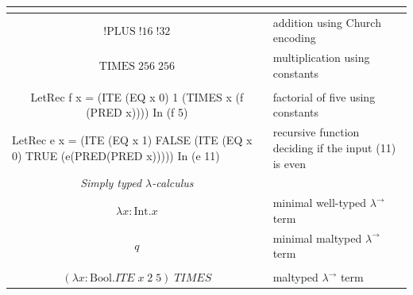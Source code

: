 \documentclass[table, a4paper, 10pt]{article}
\begin{document}
\begin{table}[H]
\begin{tabular}{cl}
\multicolumn{1}{|c|}{}                                                                                              & \multicolumn{1}{l|}{}                                                        \\ \hline
\multicolumn{1}{|c|}{$!\mathrm{PLUS}\;!\mathrm{16}\;!\mathrm{32}$}                                                  & \multicolumn{1}{l|}{addition using Church encoding}                          \\ \hline
\multicolumn{1}{|c|}{$\mathrm{TIMES}\;\mathrm{256}\;\mathrm{256}$}                                                  & \multicolumn{1}{l|}{multiplication using constants}                          \\ \hline
\multicolumn{1}{|c|}{}                                                                                              & \multicolumn{1}{l|}{}                                                        \\ \hline
\multicolumn{1}{|c|}{\scriptsize LetRec f x = (ITE (EQ x 0) 1 (TIMES x (f (PRED x)))) In (f 5)}                     & \multicolumn{1}{l|}{factorial of five using constants}                       \\ \hline
\multicolumn{1}{|l|}{\scriptsize LetRec e x = (ITE (EQ x 1) FALSE (ITE (EQ x 0) TRUE (e(PRED(PRED x))))) In (e 11)} & \multicolumn{1}{l|}{recursive function deciding if the input (11) is even}   \\ \hline
\multicolumn{1}{|c|}{\scriptsize \textit{Simply typed $\lambda$-calculus}}                                          & \multicolumn{1}{l|}{}                                                        \\ \hline
\multicolumn{1}{|c|}{$\lambda x:\mathrm{Int}.x$}                                                                    & \multicolumn{1}{l|}{minimal well-typed $\lambda^\to$ term}                   \\ \hline
\multicolumn{1}{|c|}{$q$}                                                                                           & \multicolumn{1}{l|}{minimal maltyped $\lambda^\to$ term}                     \\ \hline
\multicolumn{1}{|l|}{}                                                                                              & \multicolumn{1}{l|}{}                                                        \\ \hline
\multicolumn{1}{|c|}{$(\lambda x:\mathrm{Bool}.\mathit{ITE}\;x\;\mathit{2}\;\mathit{5})\;\mathit{TIMES}$}           & \multicolumn{1}{l|}{maltyped $\lambda^\to$ term}                             \\ \hline

\end{tabular}
\end{table}
\end{document}
